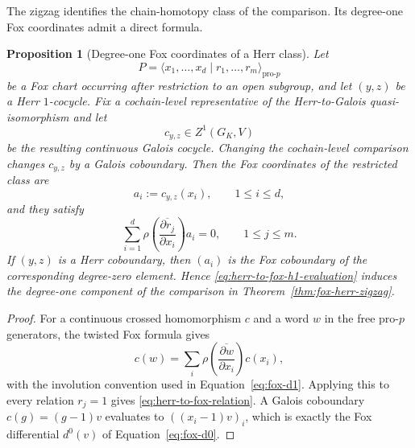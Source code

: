 \documentclass[11pt]{article}
\newtheorem{proposition}[theorem]{Proposition}
\theoremstyle{definition}
\begin{document}
The zigzag identifies the chain-homotopy class of the comparison.  Its degree-one Fox coordinates admit a direct formula.

\begin{proposition}[Degree-one Fox coordinates of a Herr class]\label{prop:herr-to-fox-h1}
Let
\[
 P=\langle x_1,\ldots,x_d\mid r_1,\ldots,r_m\rangle_{\mathrm{pro}\text{-}p}
\]
be a Fox chart occurring after restriction to an open subgroup, and let $(y,z)$ be a Herr $1$-cocycle.  Fix a cochain-level representative of the Herr-to-Galois quasi-isomorphism and let
\[
 c_{y,z}\in Z^1(G_K,V)
\]
be the resulting continuous Galois cocycle.  Changing the cochain-level comparison changes $c_{y,z}$ by a Galois coboundary.  Then the Fox coordinates of the restricted class are
\begin{equation}\label{eq:herr-to-fox-h1-evaluation}
 a_i:=c_{y,z}(x_i),
 \qquad 1\le i\le d,
\end{equation}
and they satisfy
\begin{equation}\label{eq:herr-to-fox-relation}
 \sum_{i=1}^d
 \rho\!\left(
 \overline{\frac{\partial r_j}{\partial x_i}}
 \right)a_i
 =0,
 \qquad 1\le j\le m.
\end{equation}
If $(y,z)$ is a Herr coboundary, then $(a_i)$ is the Fox coboundary of the corresponding degree-zero element.  Hence \eqref{eq:herr-to-fox-h1-evaluation} induces the degree-one component of the comparison in Theorem~\ref{thm:fox-herr-zigzag}.
\end{proposition}

\begin{proof}
For a continuous crossed homomorphism $c$ and a word $w$ in the free pro-$p$ generators, the twisted Fox formula gives
\[
 c(w)
 =
 \sum_i
 \rho\!\left(
 \overline{\frac{\partial w}{\partial x_i}}
 \right)c(x_i),
\]
with the involution convention used in Equation~\eqref{eq:fox-d1}.  Applying this to every relation $r_j=1$ gives \eqref{eq:herr-to-fox-relation}.  A Galois coboundary $c(g)=(g-1)v$ evaluates to $((x_i-1)v)_i$, which is exactly the Fox differential $d^0(v)$ of Equation~\eqref{eq:fox-d0}.
\end{proof}
\end{document}
